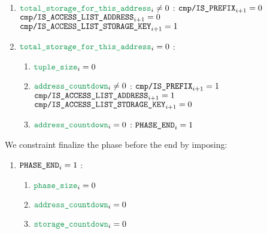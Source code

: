 \begin{enumerate}[resume]
\begin{enumerate}[resume]
\begin{enumerate}
					\item \If $\locTotStorageForThisAddress _{i} \neq 0$ \Then: $\texttt{cmp}\texttt{/}\texttt{{\texttt{IS\_PREFIX}}} _{i + 1} = 0$ \et $\texttt{cmp}\texttt{/}\texttt{{IS\_ACCESS\_LIST\_ADDRESS}} _{i + 1} = 0$ \et $\texttt{cmp}\texttt{/}\texttt{{IS\_ACCESS\_LIST\_STORAGE\_KEY}} _{i + 1} = 1$
					\item \If $\locTotStorageForThisAddress _{i} = 0$ \Then:
						\begin{enumerate}
							\item $\locAccessListTupleSize _{i} = 0$
							\item \If $\locAddressPrewarmingCountdown _{i} \neq 0$ \Then: $\texttt{cmp}\texttt{/}\texttt{{\texttt{IS\_PREFIX}}} _{i + 1} = 1$ \et $\texttt{cmp}\texttt{/}\texttt{{IS\_ACCESS\_LIST\_ADDRESS}} _{i + 1} = 1$ \et $\texttt{cmp}\texttt{/}\texttt{{IS\_ACCESS\_LIST\_STORAGE\_KEY}} _{i + 1} = 0$
							\item \If $\locAddressPrewarmingCountdown _{i} = 0$ \Then: $\texttt{PHASE\_END} _{i} =1$
						\end{enumerate}
				\end{enumerate}
		\end{enumerate}

		We constraint finalize the phase before the end by imposing:
		\begin{enumerate}
			\item \If $\texttt{PHASE\_END} _{i} =1$ \Then:
				\begin{enumerate}
					\item $\locPhaseSize _{i} =0$
					\item $\locAddressPrewarmingCountdown _{i} =0$
					\item $\locStoragePrewarmingCountdown _{i} =0$
				\end{enumerate}
		\end{enumerate}


\end{enumerate}
